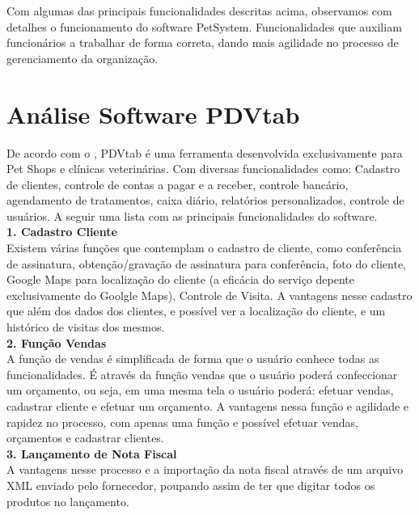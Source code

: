 \documentclass[12pt,openright,twoside,a4paper,english,french,spanish,brazil]{abntex2}
\begin{document}
Com algumas das principais funcionalidades descritas acima, observamos com detalhes o funcionamento do software PetSystem. Funcionalidades que auxiliam funcionários a trabalhar de forma correta, dando mais agilidade no processo de gerenciamento da organização.


\section*{Análise Software PDVtab}
De acordo com o \cite{NetServiceConsultoria2013}, PDVtab é uma ferramenta desenvolvida exclusivamente para Pet Shops e clínicas veterinárias. Com diversas funcionalidades como: Cadastro de clientes, controle de contas a pagar e a receber, controle bancário, agendamento de tratamentos, caixa diário, relatórios personalizados, controle de usuários. A seguir uma lista com as principais funcionalidades do software. \\
\textbf{1.	{Cadastro Cliente}}\\
Existem várias funções que contemplam o cadastro de cliente, como conferência de assinatura, obtenção/gravação de assinatura para conferência, foto do cliente, Google Maps para localização do cliente (a eficácia do serviço depente exclusivamente do Goolgle Maps), Controle de Visita. A vantagens nesse cadastro que além dos dados dos clientes, e possível ver a localização do cliente, e um histórico de visitas dos mesmos.\\
\textbf{2.	{Função Vendas}}\\
A função de vendas é simplificada de forma que o usuário conhece todas as funcionalidades. É através da função vendas que o usuário poderá confeccionar um orçamento, ou seja, em uma mesma tela o usuário poderá: efetuar vendas, cadastrar cliente e efetuar um orçamento. A vantagens nessa função e agilidade e rapidez no processo, com apenas uma função e possível efetuar vendas, orçamentos e cadastrar clientes.\\
\textbf{3.	{Lançamento de Nota Fiscal}}\\
A vantagens nesse processo e a importação da nota fiscal através de um arquivo XML enviado pelo fornecedor, poupando assim de ter que digitar todos os produtos no lançamento.\\
\end{document}

